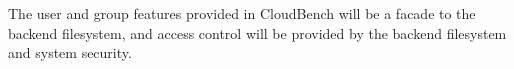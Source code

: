The user and group features provided in CloudBench will be a facade to
the backend filesystem, and access control will be provided by the
backend filesystem and system security.






